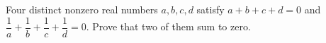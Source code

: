 Four distinct nonzero real numbers $a,b,c,d$ satisfy $a+b+c+d=0$ and $\dfrac{1}{a}+\dfrac{1}{b}+\dfrac{1}{c}+\dfrac{1}{d}=0$. Prove that two of them sum to zero.
